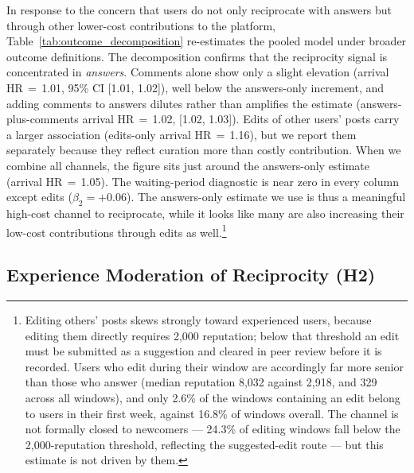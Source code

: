 In response to the concern that users do not only reciprocate with answers but through other lower-cost contributions to the platform, Table~\ref{tab:outcome_decomposition} re-estimates the pooled model under broader outcome definitions. The decomposition confirms that the reciprocity signal is concentrated in \emph{answers}. Comments alone show only a slight elevation (arrival HR\,$=$\,1.01, 95\% CI [1.01, 1.02]), well below the answers-only increment, and adding comments to answers dilutes rather than amplifies the estimate (answers-plus-comments arrival HR\,$=$\,1.02, [1.02, 1.03]). Edits of other users' posts carry a larger association (edits-only arrival HR\,$=$\,1.16), but we report them separately because they reflect curation more than costly contribution. When we combine all channels, the figure sits just around the answers-only estimate (arrival HR\,$=$\,1.05). The waiting-period diagnostic is near zero in every column except edits ($\beta_2 = +0.06$).
The answers-only estimate we use is thus a meaningful high-cost channel to reciprocate, while it looks like many are also increasing their low-cost contributions through edits as well.\footnote{Editing others' posts skews strongly toward experienced users, because editing them directly requires 2,000 reputation; below that threshold an edit must be submitted as a suggestion and cleared in peer review before it is recorded. Users who edit during their window are accordingly far more senior than those who answer (median reputation 8,032 against 2,918, and 329 across all windows), and only 2.6\% of the windows containing an edit belong to users in their first week, against 16.8\% of windows overall. The channel is not formally closed to newcomers --- 24.3\% of editing windows fall below the 2,000-reputation threshold, reflecting the suggested-edit route --- but this estimate is not driven by them.}



\subsection{Experience Moderation of Reciprocity (H2)}
\label{sec:h2_results}

